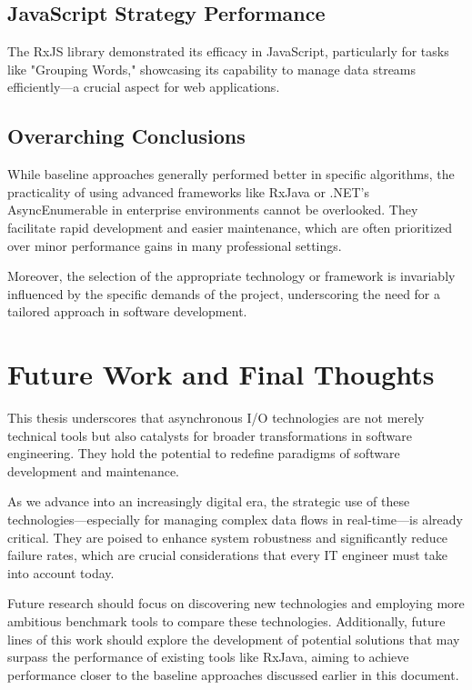 \subsection{JavaScript Strategy Performance}
The RxJS library demonstrated its efficacy in JavaScript, particularly for tasks like "Grouping Words," showcasing its capability to manage data streams efficiently—a crucial aspect for web applications.

\subsection{Overarching Conclusions}
While baseline approaches generally performed better in specific algorithms, the practicality of using advanced frameworks like RxJava or .NET's AsyncEnumerable in enterprise environments cannot be overlooked. They facilitate rapid development and easier maintenance, which are often prioritized over minor performance gains in many professional settings.

Moreover, the selection of the appropriate technology or framework is invariably influenced by the specific demands of the project, underscoring the need for a tailored approach in software development.

\section{Future Work and Final Thoughts}

This thesis underscores that asynchronous I/O technologies are not merely technical tools but also catalysts for broader transformations in software engineering. They hold the potential to redefine paradigms of software development and maintenance.

As we advance into an increasingly digital era, the strategic use of these technologies—especially for managing complex data flows in real-time—is already critical. They are poised to enhance system robustness and significantly reduce failure rates, which are crucial considerations that every IT engineer must take into account today.

Future research should focus on discovering new technologies and employing more ambitious benchmark tools to compare these technologies. Additionally, future lines of this work should explore the development of potential solutions that may surpass the performance of existing tools like RxJava, aiming to achieve performance closer to the baseline approaches discussed earlier in this document.


